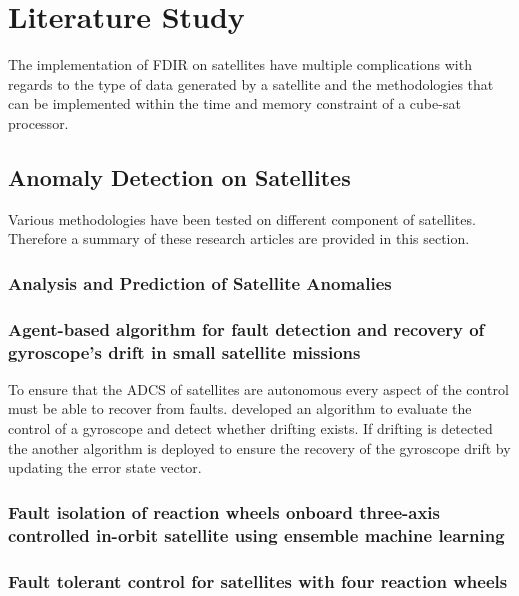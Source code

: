\chapter{Literature Study}
\vspace{-2em}
\minitoc

The implementation of FDIR on satellites have multiple complications with regards to the type of data generated by a satellite and the methodologies that can be implemented within the time and memory constraint of a cube-sat processor.

\section{Anomaly Detection on Satellites}
Various methodologies have been tested on different component of satellites. Therefore a summary of these research articles are provided in this section.

\subsection{Analysis and Prediction of Satellite Anomalies}
\textcite{Wintoft}

\subsection{Agent-based algorithm for fault detection and recovery of gyroscope's drift in small satellite missions}
To ensure that the ADCS of satellites are autonomous every aspect of the control must be able to recover from faults. \textcite{carvajal2017agent} developed an algorithm to evaluate the control of a gyroscope and detect whether drifting exists. If drifting is detected the another algorithm is deployed to ensure the recovery of the gyroscope drift by updating the error state vector.

\subsection{Fault isolation of reaction wheels onboard three-axis controlled in-orbit satellite using ensemble machine learning}
\cite{rahimi2020fault}

\subsection{Fault tolerant control for satellites with four reaction wheels}
\cite{jin2008fault}

